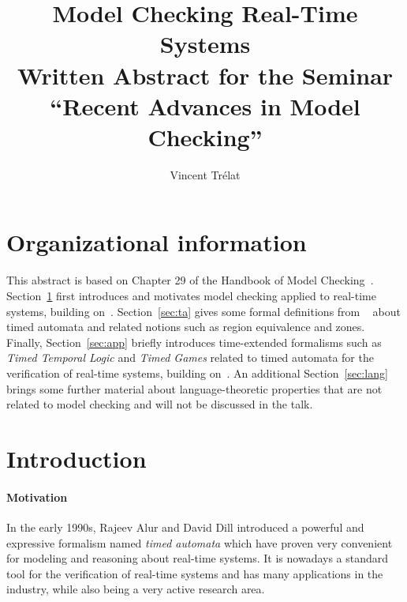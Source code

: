 \documentclass[11pt]{article}
\title{Model Checking Real-Time Systems\\\small Written Abstract for the Seminar ``Recent Advances in Model Checking''}
\author{Vincent Trélat}
\date{}
\theoremstyle{definition}
\theoremstyle{remark}
\theoremstyle{definition}
\begin{document}
\maketitle	

\section*{Organizational information}
This abstract is based on Chapter 29 of the Handbook of Model Checking~\cite{handbook}.
Section~\ref{sec:intro} first introduces and motivates model checking applied to real-time systems, building on~\cite[Chapters~29.1 and 29.2]{handbook}.
Section~\ref{sec:ta} gives some formal definitions from ~\cite[Chapters~29.2 and 29.7]{handbook} about timed automata and related notions such as region equivalence and zones.
Finally, Section~\ref{sec:app} briefly introduces time-extended formalisms such as \emph{Timed Temporal Logic} and \emph{Timed Games} related to timed automata for the verification of real-time systems, building on~\cite[Chapters~29.6~and~29.9]{handbook}.
An additional Section~\ref{sec:lang} brings some further material about language-theoretic properties that are not related to model checking and will not be discussed in the talk.

\section{Introduction}\label{sec:intro}
\paragraph{Motivation} In the early 1990s, Rajeev Alur and David Dill introduced a powerful and expressive formalism named \emph{timed automata} which have proven very convenient for modeling and reasoning about real-time systems.
It is nowadays a standard tool for the verification of real-time systems and has many applications in the industry, while also being a very active research area.
\end{document}
